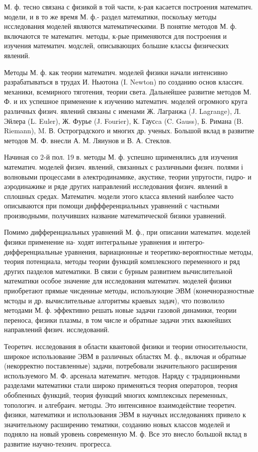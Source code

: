 \documentclass[10pt]{article}
\begin{document}
М. ф. тесно связана с физикой в той части, к-рая касается построения математич. модели, и в то же время М. ф.- раздел математики, поскольку методы нсследования моделей являются математическими. В понятие методов М. ф. включаются те математич. методы, к-рые применяются для построения и изучения математич. модслей, описывающих большие классы физических явлений.



Методы М. ф. как теории математич. моделей физики начали интенсивно разрабатываться в трудах И. Ньютона (I. Newton) по созданию основ классич. механики, всемирного тяготения, теории света. Дальнейшее развитие методов М. Ф. и их успешное применение к изучению математич. моделей огромного круга различных физич. явлений связаны с именами Ж. Лагранжа (J. Lagrange), Л. Эйлера (L. Euler), Ж. Фурье (J. Fourier), К. Гаусca (C. Gauss), Б. Римана (B. Riemann), M. В. Остроградского и многих др. ученых. Большой вклад в развитие методов М. Ф. внесли А. М. Ляиунов и В. А. Стеклов.



Начиная со 2-й пол. 19 в. методы М. ф. успешно шрименялись для изучения математич. моделей физич. явлений, связанных с различными физич. полями і волновыми процессами в әлектродинамике, акустике, теории упругости, гидро- и аэродинажике и ряде других направлений исследования физич. явлений в сплошных средах. Математич. модели этого класса явлений наиболее часто описываются при помощи диффференциальных уравнений с частными производными, получивших название математической бизики уравнений.



Помимо дифференциальных уравнений М. ф., при описании математич. моделей физики применение на- ходят интегральные уравнения и интегро-дифференциальные уравнения, вариационные и теоретико-вероятностные методы, теория потенциала, методы теории функций комплексного переменного и ряд других пазделов математики. В связи с бурным развитием вычислительной математики особое значение для исследования математич. моделей физики приобретают прямые чисденные методы, используюцие ЭВМ (конечноразностные мстоды и др. вычислительные алгоритмы краевых задач), что позволило методами М. ф. эффективно решать новые задачи газовой динамики, теории переноса, физики плазмы, в том числе и обратные задачи этих важнейших направлений физич. исследований.



Теоретич. исследования в области квантовой физики и теории относительности, широкое использование ЭВМ в различных областях М. ф., включая и обратные (некорректно поставленные) задачи, потребовали значительного расширения используемого М. Ф. арсенала математич. методов. Наряду с традиционными разделами математики стали широко применяться теория операторов, теория обобпенных функций, теория функций многих комплексных переменных, топологич. и алгебраич. методы. Это интенсивное взаимодеӥствие теоретич. физики, математики и использования ЭВМ в научных исследованиях привело к значительному расширению тематики, созданию новых классов моделей и подняло на новый уровень современную М. ф. Все это внесло большой вклад в развитие научно-технич. прогресса.
\end{document}
